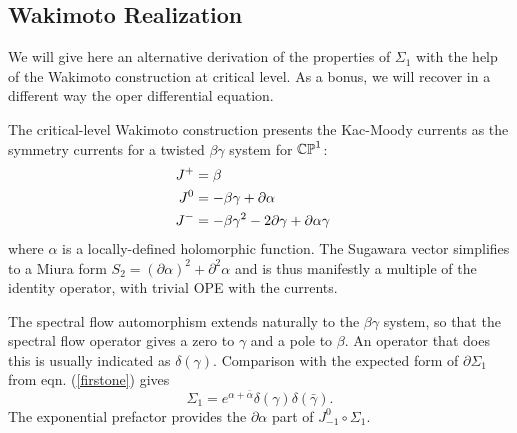 \documentclass[11pt,a4paper]{article}
\begin{document}
%


\subsection{Wakimoto Realization}
We will give here an alternative derivation of the properties of $\Sigma_1$ with the help of the Wakimoto construction at critical level. As a bonus, we will recover in a different way the oper differential equation.

The critical-level Wakimoto construction presents the Kac-Moody currents as the symmetry currents for a twisted $\beta\gamma$ system for ${\mathbb{CP}}^1$:
\begin{align}\label{waki}
J^+ &= \beta \cr
J^0 &= - \beta \gamma + \partial \alpha \cr
J^- &= -\beta \gamma^2 - 2 \partial \gamma + \partial \alpha \gamma \cr
\end{align}
where $\alpha$ is a locally-defined holomorphic function. The Sugawara vector simplifies to a Miura form $S_2 = (\partial\alpha)^2 + \partial^2 \alpha$ and is thus manifestly a multiple of the identity operator, with trivial OPE with the currents. 

The spectral flow automorphism extends naturally to the $\beta\gamma$ system, so that the spectral flow operator gives a zero to $\gamma$ and a pole to $\beta$. An
operator that does this is usually indicated as $\delta(\gamma)$. Comparison with the expected form of $\partial \Sigma_1$ from eqn. (\ref{firstone})  gives 
\begin{equation}
\Sigma_1 = e^{\alpha+ \bar \alpha} \delta(\gamma)\delta(\bar \gamma).
\end{equation}
The exponential prefactor provides the $\partial \alpha$ part of $J^0_{-1} \circ \Sigma_1$.
\end{document}
